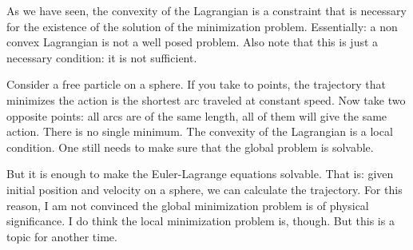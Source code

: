 \documentclass[aps,pra,10pt,floatfix,nofootinbib]{revtex4-1}
\theoremstyle{definition}
\begin{document}
As we have seen, the convexity of the Lagrangian is a constraint that is necessary for the existence of the solution of the minimization problem. Essentially: a non convex Lagrangian is not a well posed problem. Also note that this is just a necessary condition: it is not sufficient.

Consider a free particle on a sphere. If you take to points, the trajectory that minimizes the action is the shortest arc traveled at constant speed. Now take two opposite points: all arcs are of the same length, all of them will give the same action. There is no single minimum. The convexity of the Lagrangian is a local condition. One still needs to make sure that the global problem is solvable.

But it is enough to make the Euler-Lagrange equations solvable. That is: given initial position and velocity on a sphere, we can calculate the trajectory. For this reason, I am not convinced the global minimization problem is of physical significance. I do think the local minimization problem is, though. But this is a topic for another time.
\end{document}
